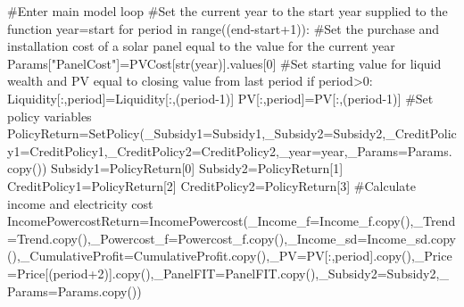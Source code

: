 \documentclass[
  letterpaper,
  DIV=11,
  numbers=noendperiod]{scrartcl}
\newenvironment{Shaded}{\begin{snugshade}}{\end{snugshade}}
\newcommand{\BuiltInTok}[1]{\textcolor[rgb]{0.00,0.23,0.31}{#1}}
\newcommand{\CommentTok}[1]{\textcolor[rgb]{0.37,0.37,0.37}{#1}}
\newcommand{\ControlFlowTok}[1]{\textcolor[rgb]{0.00,0.23,0.31}{#1}}
\newcommand{\DecValTok}[1]{\textcolor[rgb]{0.68,0.00,0.00}{#1}}
\newcommand{\KeywordTok}[1]{\textcolor[rgb]{0.00,0.23,0.31}{#1}}
\newcommand{\NormalTok}[1]{\textcolor[rgb]{0.00,0.23,0.31}{#1}}
\newcommand{\OperatorTok}[1]{\textcolor[rgb]{0.37,0.37,0.37}{#1}}
\newcommand{\StringTok}[1]{\textcolor[rgb]{0.13,0.47,0.30}{#1}}
\begin{document}
\begin{Shaded}
\begin{Highlighting}[]
    \CommentTok{\#Enter main model loop}
    \CommentTok{\#Set the current year to the start year supplied to the function}
\NormalTok{    year}\OperatorTok{=}\NormalTok{start}
    \ControlFlowTok{for}\NormalTok{ period }\KeywordTok{in} \BuiltInTok{range}\NormalTok{((end}\OperatorTok{{-}}\NormalTok{start}\OperatorTok{+}\DecValTok{1}\NormalTok{)):}
        \CommentTok{\#Set the purchase and installation cost of a solar panel equal to the value for the current year}
\NormalTok{        Params[}\StringTok{"PanelCost"}\NormalTok{]}\OperatorTok{=}\NormalTok{PVCost[}\BuiltInTok{str}\NormalTok{(year)].values[}\DecValTok{0}\NormalTok{]}
        \CommentTok{\#Set starting value for liquid wealth and PV equal to closing value from last period}
        \ControlFlowTok{if}\NormalTok{ period}\OperatorTok{\textgreater{}}\DecValTok{0}\NormalTok{:}
\NormalTok{            Liquidity[:,period]}\OperatorTok{=}\NormalTok{Liquidity[:,(period}\OperatorTok{{-}}\DecValTok{1}\NormalTok{)]}
\NormalTok{            PV[:,period]}\OperatorTok{=}\NormalTok{PV[:,(period}\OperatorTok{{-}}\DecValTok{1}\NormalTok{)]}
        \CommentTok{\#Set policy variables}
\NormalTok{        PolicyReturn}\OperatorTok{=}\NormalTok{SetPolicy(\_Subsidy1}\OperatorTok{=}\NormalTok{Subsidy1,\_Subsidy2}\OperatorTok{=}\NormalTok{Subsidy2,\_CreditPolicy1}\OperatorTok{=}\NormalTok{CreditPolicy1,\_CreditPolicy2}\OperatorTok{=}\NormalTok{CreditPolicy2,\_year}\OperatorTok{=}\NormalTok{year,\_Params}\OperatorTok{=}\NormalTok{Params.copy())}
\NormalTok{        Subsidy1}\OperatorTok{=}\NormalTok{PolicyReturn[}\DecValTok{0}\NormalTok{]}
\NormalTok{        Subsidy2}\OperatorTok{=}\NormalTok{PolicyReturn[}\DecValTok{1}\NormalTok{]}
\NormalTok{        CreditPolicy1}\OperatorTok{=}\NormalTok{PolicyReturn[}\DecValTok{2}\NormalTok{]}
\NormalTok{        CreditPolicy2}\OperatorTok{=}\NormalTok{PolicyReturn[}\DecValTok{3}\NormalTok{]}
        \CommentTok{\#Calculate income and electricity cost}
\NormalTok{        IncomePowercostReturn}\OperatorTok{=}\NormalTok{IncomePowercost(\_Income\_f}\OperatorTok{=}\NormalTok{Income\_f.copy(),\_Trend}\OperatorTok{=}\NormalTok{Trend.copy(),\_Powercost\_f}\OperatorTok{=}\NormalTok{Powercost\_f.copy(),\_Income\_sd}\OperatorTok{=}\NormalTok{Income\_sd.copy(),\_CumulativeProfit}\OperatorTok{=}\NormalTok{CumulativeProfit.copy(),\_PV}\OperatorTok{=}\NormalTok{PV[:,period].copy(),\_Price}\OperatorTok{=}\NormalTok{Price[(period}\OperatorTok{+}\DecValTok{2}\NormalTok{)].copy(),\_PanelFIT}\OperatorTok{=}\NormalTok{PanelFIT.copy(),\_Subsidy2}\OperatorTok{=}\NormalTok{Subsidy2,\_Params}\OperatorTok{=}\NormalTok{Params.copy())}

\end{Highlighting}
\end{Shaded}
\end{document}
